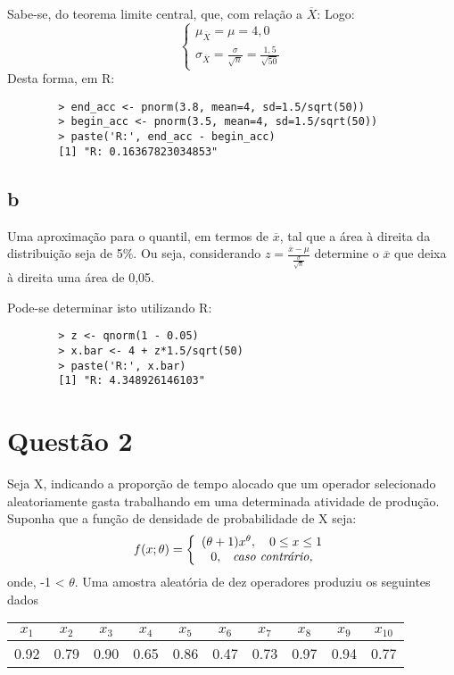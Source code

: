 \documentclass{article}[twocolumn]
\begin{document}
	Sabe-se, do teorema limite central, que, com rela\c{c}\~ao a $\overline{X}$:
	Logo:
	\begin{equation}
		\left\{\begin{array}{c}
			\mu_{\overline{X}} = \mu = 4,0\\
			\sigma_{\overline{X}} = \frac{\sigma}{\sqrt{n}} = \frac{1,5}{\sqrt{50}}
		\end{array}\right.
		\nonumber
	\end{equation}
	Desta forma, em R:
	\begin{verbatim}
		> end_acc <- pnorm(3.8, mean=4, sd=1.5/sqrt(50))
		> begin_acc <- pnorm(3.5, mean=4, sd=1.5/sqrt(50))
		> paste('R:', end_acc - begin_acc)
		[1] "R: 0.16367823034853"
	\end{verbatim}
	\subsection{b}
	Uma aproximação para o quantil, em termos de $\overline{x}$, tal que a área
	à direita da distribuição seja de 5\%. Ou seja, considerando
	$z = \frac{\overline{x} - \mu}{\frac{\sigma}{\sqrt{n}}}$
	determine o $\overline{x}$ que deixa à direita uma área de 0,05.

	Pode-se determinar isto utilizando R:
	\begin{verbatim}
		> z <- qnorm(1 - 0.05)
		> x.bar <- 4 + z*1.5/sqrt(50)
		> paste('R:', x.bar)
		[1] "R: 4.348926146103"
	\end{verbatim}
	\section{Quest\~ao 2}
	Seja X, indicando a proporção de tempo alocado que um operador selecionado
	aleatoriamente gasta trabalhando em uma determinada atividade de produção. Suponha
	que a função de densidade de probabilidade de X seja:
	\begin{equation}
		f(x; \theta) = \left\{\begin{array}{c}
			(\theta + 1)x^\theta, \quad 0 \leq x \leq 1\\
			0, \quad $$\textit{caso contr\'ario,}$$
		\end{array}\right.
		\nonumber
	\end{equation}
	onde, -1 < $\theta$. Uma amostra aleat\'oria de dez operadores produziu os
	seguintes dados
	\begin{table}[H]
		\centering
		\begin{tabular}{|c|c|c|c|c|c|c|c|c|c|}
			$x_1$ & $x_2$ & $x_3$ & $x_4$ & $x_5$ & $x_6$ & $x_7$ & $x_8$ & $x_9$ & $x_{10}$\\
			\hline
			0.92 & 0.79 & 0.90 & 0.65 & 0.86 & 0.47 & 0.73 & 0.97 & 0.94 & 0.77
		\end{tabular}
	\end{table}
\end{document}
